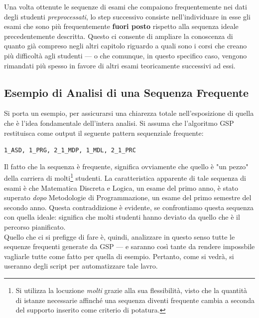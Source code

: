     Una volta ottenute le sequenze di esami che compaiono frequentemente nei dati degli studenti \textit{preprocessati}, lo step successivo consiste nell'individuare in esse gli esami che sono più frequentemente \textbf{fuori posto} rispetto alla sequenza ideale precedentemente descritta. Questo ci consente di ampliare la conoscenza di quanto già compreso negli altri capitolo riguardo a quali sono i corsi che creano più difficoltà agli studenti --- o che comunque, in questo specifico caso, vengono rimandati più spesso in favore di altri esami teoricamente successivi ad essi. \\

    \subsection{Esempio di Analisi di una Sequenza Frequente}

    Si porta un esempio, per assicurarsi una chiarezza totale nell'esposizione di quella che è l'idea fondamentale dell'intera analisi. Si assuma che l'algoritmo GSP restituisca come output il seguente pattern sequenziale frequente: \\

    \begin{centering}
        \texttt{1\_ASD, 1\_PRG, 2\_1\_MDP, 1\_MDL, 2\_1\_PRC}
    \end{centering}

    \vspace{0.35cm}

    Il fatto che la sequenza è frequente, significa ovviamente che quello è "un pezzo" della carriera di molti\footnote{Si utilizza la locuzione \textit{molti} grazie alla sua flessibilità, visto che la quantità di istanze necessarie affinché una sequenza diventi frequente cambia a seconda del supporto inserito come criterio di potatura.} studenti. La caratteristica apparente di tale sequenza di esami è che Matematica Discreta e Logica, un esame del primo anno, è stato superato \textit{dopo} Metodologie di Programmazione, un esame del primo semestre del secondo anno. Questa contraddizione è evidente, se confrontiamo questa sequenza con quella ideale: significa che molti studenti hanno deviato da quello che è il percorso pianificato.\\

    Quello che ci si prefigge di fare è, quindi, analizzare in questo senso tutte le sequenze frequenti generate da GSP --- e saranno così tante da rendere impossbile vagliarle tutte come fatto per quella di esempio. Pertanto, come si vedrà, si useranno degli script per automatizzare tale lavro.

